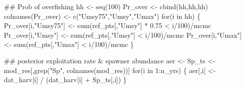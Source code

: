 \documentclass[
  11pt,
]{article}
\newenvironment{Shaded}{}{}
\newcommand{\ControlFlowTok}[1]{\textcolor[rgb]{0.00,0.00,1.00}{#1}}
\newcommand{\DecValTok}[1]{#1}
\newcommand{\DocumentationTok}[1]{\textcolor[rgb]{0.00,0.50,0.00}{#1}}
\newcommand{\FloatTok}[1]{#1}
\newcommand{\FunctionTok}[1]{#1}
\newcommand{\NormalTok}[1]{#1}
\newcommand{\OtherTok}[1]{\textcolor[rgb]{1.00,0.25,0.00}{#1}}
\newcommand{\SpecialCharTok}[1]{\textcolor[rgb]{0.00,0.50,0.50}{#1}}
\newcommand{\StringTok}[1]{\textcolor[rgb]{0.00,0.50,0.50}{#1}}
\begin{document}
\begin{Shaded}
\begin{Highlighting}[]
\DocumentationTok{\#\# Prob of overfishing}
\NormalTok{hh }\OtherTok{\textless{}{-}} \FunctionTok{seq}\NormalTok{(}\DecValTok{100}\NormalTok{)}
\NormalTok{Pr\_over }\OtherTok{\textless{}{-}} \FunctionTok{cbind}\NormalTok{(hh,hh,hh)}
\FunctionTok{colnames}\NormalTok{(Pr\_over) }\OtherTok{\textless{}{-}} \FunctionTok{c}\NormalTok{(}\StringTok{"Umsy75"}\NormalTok{,}\StringTok{"Umsy"}\NormalTok{,}\StringTok{"Umax"}\NormalTok{)}
\ControlFlowTok{for}\NormalTok{(i }\ControlFlowTok{in}\NormalTok{ hh) \{}
\NormalTok{  Pr\_over[i,}\StringTok{"Umsy75"}\NormalTok{] }\OtherTok{\textless{}{-}} \FunctionTok{sum}\NormalTok{(ref\_pts[,}\StringTok{"Umsy"}\NormalTok{] }\SpecialCharTok{*} \FloatTok{0.75} \SpecialCharTok{\textless{}}\NormalTok{ i}\SpecialCharTok{/}\DecValTok{100}\NormalTok{)}\SpecialCharTok{/}\NormalTok{mcmc}
\NormalTok{  Pr\_over[i,}\StringTok{"Umsy"}\NormalTok{] }\OtherTok{\textless{}{-}} \FunctionTok{sum}\NormalTok{(ref\_pts[,}\StringTok{"Umsy"}\NormalTok{] }\SpecialCharTok{\textless{}}\NormalTok{ i}\SpecialCharTok{/}\DecValTok{100}\NormalTok{)}\SpecialCharTok{/}\NormalTok{mcmc}
\NormalTok{  Pr\_over[i,}\StringTok{"Umax"}\NormalTok{] }\OtherTok{\textless{}{-}} \FunctionTok{sum}\NormalTok{(ref\_pts[,}\StringTok{"Umax"}\NormalTok{] }\SpecialCharTok{\textless{}}\NormalTok{ i}\SpecialCharTok{/}\DecValTok{100}\NormalTok{)}\SpecialCharTok{/}\NormalTok{mcmc}
\NormalTok{\}}

\DocumentationTok{\#\# posterior exploitation rate \& spawner abundance}
\NormalTok{aer }\OtherTok{\textless{}{-}}\NormalTok{ Sp\_ts }\OtherTok{\textless{}{-}}\NormalTok{ mod\_res[,}\FunctionTok{grep}\NormalTok{(}\StringTok{"Sp"}\NormalTok{, }\FunctionTok{colnames}\NormalTok{(mod\_res))]}
\ControlFlowTok{for}\NormalTok{(i }\ControlFlowTok{in} \DecValTok{1}\SpecialCharTok{:}\NormalTok{n\_yrs) \{}
\NormalTok{    aer[,i] }\OtherTok{\textless{}{-}}\NormalTok{ dat\_harv[i] }\SpecialCharTok{/}\NormalTok{ (dat\_harv[i] }\SpecialCharTok{+}\NormalTok{ Sp\_ts[,i]) }
\NormalTok{\}}
\end{Highlighting}
\end{Shaded}
\end{document}
